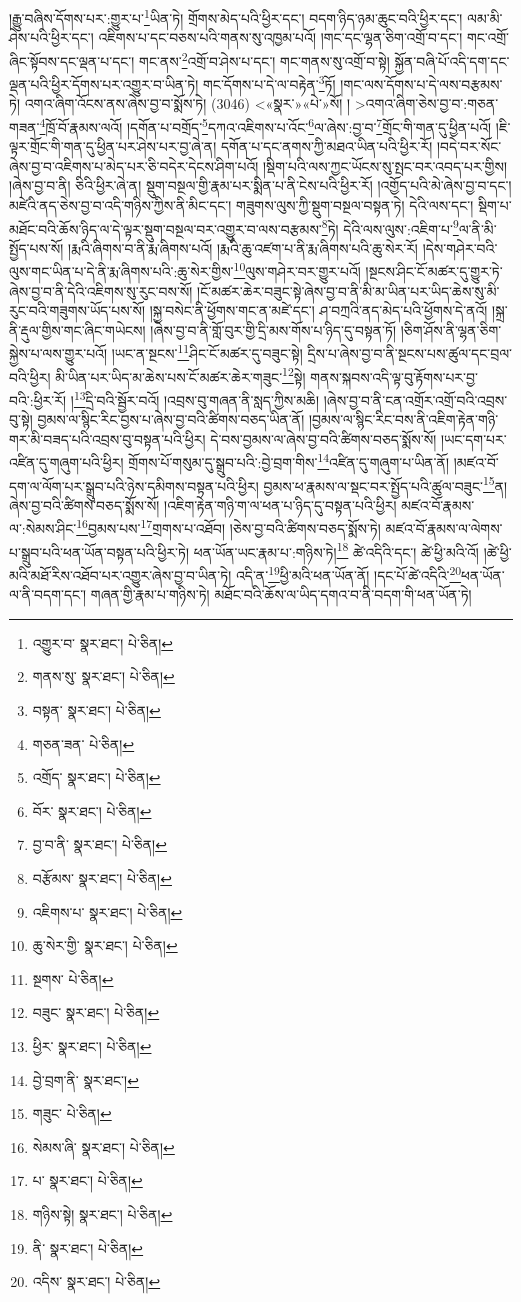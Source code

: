 །རྒྱུ་བཞིས་དོགས་པར་:གྱུར་པ་\footnote{འགྱུར་བ་  སྣར་ཐང་།  པེ་ཅིན། }ཡིན་ཏེ། གྲོགས་མེད་པའི་ཕྱིར་དང་། བདག་ཉིད་ཉམ་ཆུང་བའི་ཕྱིར་དང་། ལམ་མི་ཤེས་པའི་ཕྱིར་དང་། འཇིགས་པ་དང་བཅས་པའི་གནས་སུ་འཁྱམ་པའོ། །གང་དང་ལྷན་ཅིག་འགྲོ་བ་དང་། གང་འགྲོ་ཞིང་སྟོབས་དང་ལྡན་པ་དང་། གང་ནས་\footnote{གནས་སུ་  སྣར་ཐང་།  པེ་ཅིན། }འགྲོ་བ་ཤེས་པ་དང་། གང་གནས་སུ་འགྲོ་བ་སྟེ། སྐྱོན་བཞི་པོ་འདི་དག་དང་ལྡན་པའི་ཕྱིར་དོགས་པར་འགྱུར་བ་ཡིན་ཏེ། གང་དོགས་པ་དེ་ལ་བརྟེན་\footnote{བསྟན་  སྣར་ཐང་།  པེ་ཅིན། }ཏོ། །གང་ལས་དོགས་པ་དེ་ལས་བརྩམས་ཏེ། འགའ་ཞིག་འོངས་ནས་ཞེས་བྱ་བ་སྨོས་ཏེ། (3046) <«སྣར་»«པེ་»སོ། །
 >འགའ་ཞིག་ཅེས་བྱ་བ་:གཅན་གཟན་\footnote{གཅན་ཟན་  པེ་ཅིན། }ཁྲོ་བོ་རྣམས་ལའོ། །དགོན་པ་བགྲོད་\footnote{འགྲོད་  སྣར་ཐང་།  པེ་ཅིན། }དཀའ་འཇིགས་པ་འོང་\footnote{བོར་  སྣར་ཐང་།  པེ་ཅིན། }ལ་ཞེས་:བྱ་བ་\footnote{བྱ་བ་ནི་  སྣར་ཐང་།  པེ་ཅིན། }གྲོང་གི་གན་དུ་ཕྱིན་པའོ། །ཇི་ལྟར་གྲོང་གི་གན་དུ་ཕྱིན་པར་ཤེས་པར་བྱ་ཞེ་ན། དགོན་པ་དང་ནགས་ཀྱི་མཐའ་ཡིན་པའི་ཕྱིར་རོ། །བདེ་བར་སོང་ཞེས་བྱ་བ་འཇིགས་པ་མེད་པར་ཅི་བདེར་དེངས་ཤིག་པའོ། །སྡིག་པའི་ལས་ཀྱང་ཡོངས་སུ་སྤང་བར་འབད་པར་གྱིས། །ཞེས་བྱ་བ་ནི། ཅིའི་ཕྱིར་ཞེ་ན། སྡུག་བསྔལ་གྱི་རྣམ་པར་སྨིན་པ་ནི་ངེས་པའི་ཕྱིར་རོ། །འགྱོད་པའི་མེ་ཞེས་བྱ་བ་དང་། མཛེའི་ནད་ཅེས་བྱ་བ་འདི་གཉིས་ཀྱིས་ནི་མིང་དང་། གཟུགས་ལུས་ཀྱི་སྡུག་བསྔལ་བསྟན་ཏེ། དེའི་ལས་དང་། སྡིག་པ་མཐོང་བའི་ཆོས་ཉིད་ལ་དེ་ལྟར་སྡུག་བསྔལ་བར་འགྱུར་བ་ལས་བརྩམས་\footnote{བརྩོམས་  སྣར་ཐང་།  པེ་ཅིན། }ཏེ། དེའི་ལས་ལུས་:འཇིག་པ་\footnote{འཇིགས་པ་  སྣར་ཐང་།  པེ་ཅིན། }ལ་ནི་མི་སྤྱོད་པས་སོ། །རྨའི་ཞིགས་བ་ནི་རྨ་ཞིགས་པའོ། །རྨའི་ཆུ་འཛག་པ་ནི་རྨ་ཞིགས་པའི་ཆུ་སེར་རོ། །དེས་གཤེར་བའི་ལུས་གང་ཡིན་པ་དེ་ནི་རྨ་ཞིགས་པའི་:ཆུ་སེར་གྱིས་\footnote{ཆུ་སེར་གྱི་  སྣར་ཐང་།  པེ་ཅིན། }ལུས་གཤེར་བར་གྱུར་པའོ། །སྔངས་ཤིང་ངོ་མཚར་དུ་གྱུར་ཏེ་ཞེས་བྱ་བ་ནི་དེའི་འཇིགས་སུ་རུང་བས་སོ། །ངོ་མཚར་ཆེར་བཟུང་སྟེ་ཞེས་བྱ་བ་ནི་མི་མ་ཡིན་པར་ཡིད་ཆེས་སུ་མི་རུང་བའི་གཟུགས་ཡོད་པས་སོ། །སྐྱ་བསེང་ནི་ཕྱོགས་གང་ན་མཛེ་དང་། ཤ་བཀྲའི་ནད་མེད་པའི་ཕྱོགས་དེ་ནའོ། །སྐྲ་ནི་རྡུལ་གྱིས་གང་ཞིང་གཡེངས། །ཞེས་བྱ་བ་ནི་གློ་བུར་གྱི་དྲི་མས་གོས་པ་ཉིད་དུ་བསྟན་ཏོ། །ཅིག་ཤོས་ནི་ལྷན་ཅིག་སྐྱེས་པ་ལས་གྱུར་པའོ། །ཡང་ན་སྔངས་\footnote{སྔགས་  པེ་ཅིན། }ཤིང་ངོ་མཚར་དུ་བཟུང་སྟེ། དྲིས་པ་ཞེས་བྱ་བ་ནི་སྔངས་པས་ཚུལ་དང་བྲལ་བའི་ཕྱིར། མི་ཡིན་པར་ཡིད་མ་ཆེས་པས་ངོ་མཚར་ཆེར་གཟུང་\footnote{བཟུང་  སྣར་ཐང་།  པེ་ཅིན། }སྟེ། གནས་སྐབས་འདི་ལྟ་བུ་རྟོགས་པར་བྱ་བའི་:ཕྱིར་རོ། །\footnote{ཕྱིར་  སྣར་ཐང་།  པེ་ཅིན། }དྲི་བའི་སྦྱོར་བའོ། །འབྲས་བུ་གཞན་ནི་སླད་ཀྱིས་མཆི། །ཞེས་བྱ་བ་ནི་ངན་འགྲོར་འགྲོ་བའི་འབྲས་བུ་སྟེ། བྱམས་ལ་སྙིང་རིང་བྱས་པ་ཞེས་བྱ་བའི་ཚིགས་བཅད་ཡིན་ནོ། །བྱམས་ལ་སྙིང་རིང་བས་ནི་འཇིག་རྟེན་གཉི་གར་མི་བཟད་པའི་འབྲས་བུ་བསྟན་པའི་ཕྱིར། དེ་བས་བྱམས་ལ་ཞེས་བྱ་བའི་ཚིགས་བཅད་སྨོས་སོ། །ཡང་དག་པར་འཛིན་དུ་གཞུག་པའི་ཕྱིར། གྲོགས་པོ་གསུམ་དུ་སྒྲུབ་པའི་:བྱེ་བྲག་གིས་\footnote{བྱེ་བྲག་ནི་  སྣར་ཐང་། }འཛིན་དུ་གཞུག་པ་ཡིན་ནོ། །མཛའ་བོ་དག་ལ་ལོག་པར་སྒྲུབ་པའི་ཉེས་དམིགས་བསྟན་པའི་ཕྱིར། བྱམས་ཕ་རྣམས་ལ་སྡང་བར་སྤྱོད་པའི་ཚུལ་བཟུང་\footnote{གཟུང་  པེ་ཅིན། }ན། ཞེས་བྱ་བའི་ཚིགས་བཅད་སྨོས་སོ། །འཇིག་རྟེན་གཉི་ག་ལ་ཕན་པ་ཉིད་དུ་བསྟན་པའི་ཕྱིར། མཛའ་བོ་རྣམས་ལ་:སེམས་ཤིང་\footnote{སེམས་ཞི་  སྣར་ཐང་།  པེ་ཅིན། }བྱམས་པས་\footnote{པ་  སྣར་ཐང་།  པེ་ཅིན། }གྲགས་པ་འཐོབ། །ཅེས་བྱ་བའི་ཚིགས་བཅད་སྨོས་ཏེ། མཛའ་བོ་རྣམས་ལ་ལེགས་པ་སྒྲུབ་པའི་ཕན་ཡོན་བསྟན་པའི་ཕྱིར་ཏེ། ཕན་ཡོན་ཡང་རྣམ་པ་:གཉིས་ཏེ།\footnote{གཉིས་སྟེ།  སྣར་ཐང་།  པེ་ཅིན། } ཚེ་འདིའི་དང་། ཚེ་ཕྱི་མའི་འོ། །ཚེ་ཕྱི་མའི་མཐོ་རིས་འཐོབ་པར་འགྱུར་ཞེས་བྱ་བ་ཡིན་ཏེ། འདི་ན་\footnote{ནི་  སྣར་ཐང་།  པེ་ཅིན། }ཕྱི་མའི་ཕན་ཡོན་ནོ། །དང་པོ་ཚེ་འདིའི་\footnote{འདིས་  སྣར་ཐང་།  པེ་ཅིན། }ཕན་ཡོན་ལ་ནི་བདག་དང་། གཞན་གྱི་རྣམ་པ་གཉིས་ཏེ། མཐོང་བའི་ཆོས་ལ་ཡིད་དགའ་བ་ནི་བདག་གི་ཕན་ཡོན་ཏེ། 